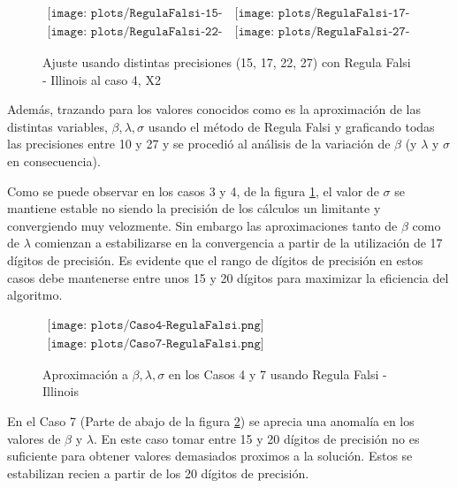 \begin{figure} [H]
$\begin{array}{cc}
\texttt{[image: plots/RegulaFalsi-15-caso4.png]} &
\texttt{[image: plots/RegulaFalsi-17-caso4.png]} \\
\texttt{[image: plots/RegulaFalsi-22-caso4.png]} &
\texttt{[image: plots/RegulaFalsi-27-caso4.png]}
\end{array}$
\caption{Ajuste usando distintas precisiones (15, 17, 22, 27) con Regula 
Falsi - Illinois al caso 4, X2}
\label{fig:FitCaso4RegulaFalsi}
\end{figure}


Adem\'as, trazando para los valores conocidos como es la aproximaci\'on de las 
distintas variables, $\beta, \lambda, \sigma$ usando el m\'etodo de Regula Falsi
y graficando todas las precisiones entre 10 y 27 y se procedi\'o al an\'alisis de
la variaci\'on de $\beta$ (y $\lambda$ y $\sigma$ en consecuencia).

Como se puede observar en los casos 3 y 4, de la figura \ref{fig:FitCaso4RegulaFalsi}, 
el valor de $\sigma$ se mantiene 
estable no siendo la precisi\'on de los c\'alculos un limitante y convergiendo 
muy velozmente. Sin embargo las aproximaciones tanto de $\beta$ como de $\lambda$ 
comienzan a estabilizarse en la convergencia a partir de la utilizaci\'on de 17 
d\'igitos de precisi\'on. Es evidente que el rango de d\'igitos de precisi\'on en 
estos casos debe mantenerse entre unos 15 y 20 d\'igitos para maximizar la 
eficiencia del algoritmo.  

\begin{figure} [H]
$\begin{array}{c}
\texttt{[image: plots/Caso4-RegulaFalsi.png]} \\
\texttt{[image: plots/Caso7-RegulaFalsi.png]}
\end{array}$

\caption{Aproximaci\'on a $\beta, \lambda, \sigma$ en los Casos 4 y 7 usando 
Regula Falsi - Illinois}
\label{fig:FitCaso4Y7RegulaFalsi}
\end{figure}

En el Caso 7 (Parte de abajo de la figura \ref{fig:FitCaso4Y7RegulaFalsi})
se aprecia una anomal\'ia en los valores de $\beta$ y $\lambda$.
En este caso tomar entre 15 y 20 d\'igitos de precisi\'on no es suficiente para 
obtener valores demasiados proximos a la soluci\'on. Estos se estabilizan recien a partir de los 20
d\'igitos de precisi\'on.

